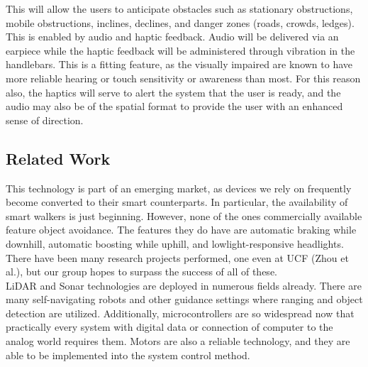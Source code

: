 \noindent This will allow the users to anticipate obstacles such as stationary obstructions, mobile obstructions, inclines, declines, and danger zones (roads, crowds, ledges). This is enabled by audio and haptic feedback. Audio will be delivered via an earpiece while the haptic feedback will be administered through vibration in the handlebars. This is a fitting feature, as the visually impaired are known to have more reliable hearing or touch sensitivity or awareness than most. For this reason also, the haptics will serve to alert the system that the user is ready, and the audio may also be of the spatial format to provide the user with an enhanced sense of direction.

\subsection{Related Work}
\indent This technology is part of an emerging market, as devices we rely on frequently become converted to their smart counterparts. In particular, the availability of smart walkers is just beginning. However, none of the ones commercially available feature object avoidance. The features they do have are automatic braking while downhill, automatic boosting while uphill, and lowlight-responsive headlights. There have been many research projects performed, one even at UCF (Zhou et al.), but our group hopes to surpass the success of all of these.\\

\noindent LiDAR and Sonar technologies are deployed in numerous fields already. There are many self-navigating robots and other guidance settings where ranging and object detection are utilized. Additionally, microcontrollers are so widespread now that practically every system with digital data or connection of computer to the analog world requires them. Motors are also a reliable technology, and they are able to be implemented into the system control method.\\
